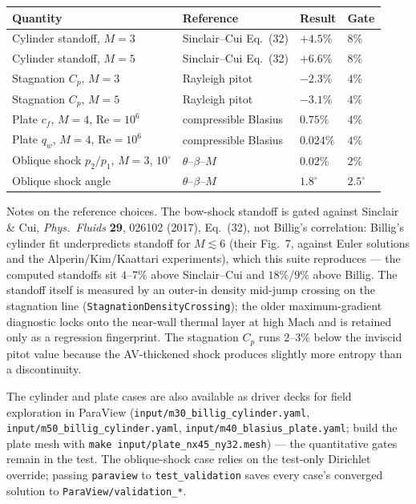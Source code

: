 \documentclass[11pt]{article}
\newcommand{\code}[1]{\texttt{#1}}
\begin{document}
\begin{center}
\begin{tabular}{llll}
\toprule
Quantity & Reference & Result & Gate \\
\midrule
Cylinder standoff, $M{=}3$ & Sinclair--Cui Eq.~(32) & $+4.5\%$ & $8\%$ \\
Cylinder standoff, $M{=}5$ & Sinclair--Cui Eq.~(32) & $+6.6\%$ & $8\%$ \\
Stagnation $C_p$, $M{=}3$  & Rayleigh pitot        & $-2.3\%$ & $4\%$ \\
Stagnation $C_p$, $M{=}5$  & Rayleigh pitot        & $-3.1\%$ & $4\%$ \\
Plate $c_f$, $M{=}4$, $\mathrm{Re}{=}10^6$ & compressible Blasius &
   $0.75\%$ & $4\%$ \\
Plate $q_w$, $M{=}4$, $\mathrm{Re}{=}10^6$ & compressible Blasius &
   $0.024\%$ & $4\%$ \\
Oblique shock $p_2/p_1$, $M{=}3$, $10^\circ$ &
   $\theta$--$\beta$--$M$ & $0.02\%$ & $2\%$ \\
Oblique shock angle & $\theta$--$\beta$--$M$ & $1.8^\circ$ &
   $2.5^\circ$ \\
\bottomrule
\end{tabular}
\end{center}

Notes on the reference choices. The bow-shock standoff is gated against
Sinclair \& Cui, \emph{Phys.\ Fluids} \textbf{29}, 026102 (2017),
Eq.~(32), not Billig's correlation: Billig's cylinder fit underpredicts
standoff for $M \lesssim 6$ (their Fig.~7, against Euler solutions and
the Alperin/Kim/Kaattari experiments), which this suite reproduces ---
the computed standoffs sit $4$--$7\%$ above Sinclair--Cui and
$18\%$/$9\%$ above Billig. The standoff itself is measured by an
outer-in density mid-jump crossing on the stagnation line
(\code{StagnationDensityCrossing}); the older maximum-gradient
diagnostic locks onto the near-wall thermal layer at high Mach and is
retained only as a regression fingerprint. The stagnation $C_p$ runs
$2$--$3\%$ below the inviscid pitot value because the AV-thickened
shock produces slightly more entropy than a discontinuity.

The cylinder and plate cases are also available as driver decks for
field exploration in ParaView
(\code{input/m30\_billig\_cylinder.yaml},
\code{input/m50\_billig\_cylinder.yaml},
\code{input/m40\_blasius\_plate.yaml}; build the plate mesh with
\code{make input/plate\_nx45\_ny32.mesh}) --- the quantitative gates
remain in the test. The oblique-shock case relies on the test-only
Dirichlet override; passing \code{paraview} to \code{test\_validation}
saves every case's converged solution to \code{ParaView/validation\_*}.
\end{document}
